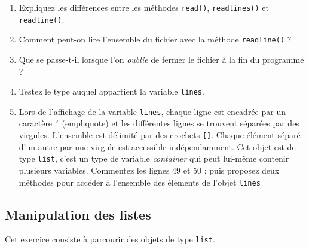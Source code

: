 \begin{enumerate}

\item Expliquez  les différences  entre les  méthodes \texttt{read()},
  \texttt{readlines()} et \texttt{readline()}.

\item  Comment peut-on lire  l'ensemble  du fichier  avec la  méthode
  \texttt{readline()} ?

\item  Que se  passe-t-il lorsque  l'on \textit{oublie}  de fermer  le
  fichier à la fin du programme ?

\item Testez le type auquel appartient la variable \texttt{lines}.

\item Lors de l'affichage de  la variable \texttt{lines}, chaque ligne
  est encadrée par un caractère \texttt{'} (emph{quote}) et les différentes
  lignes se trouvent
  séparées par des  virgules. L'ensemble est délimité  par des crochets
  \texttt{[]}.  Chaque  élément séparé d'un autre par une  virgule est accessible
  indépendamment.  Cet objet est de  type \texttt{list}, c'est un type
  de  variable \emph{container}  qui  peut  lui-même  contenir   plusieurs  variables.
  Commentez  les lignes  49 et  50 ; puis proposez  deux méthodes  pour
  accéder à l'ensemble des éléments de l'objet \texttt{lines}

\end{enumerate}

\subsection{Manipulation des listes}


Cet exercice consiste à parcourir des objets de type \texttt{list}.

